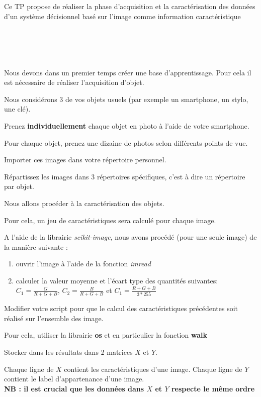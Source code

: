 \documentclass[12pt]{tdtp}
\begin{document}
\titre
Ce TP propose de réaliser la phase d'acquisition et la caractérisation des données d'un système décisionnel basé sur l'image comme information caractéristique\\
\\
\\
\\\

\Exo

Nous devons dans un premier temps créer une base d'apprentissage. Pour cela il est nécessaire de réaliser l'acquisition d'objet.

Nous considérons 3 de vos objets usuels (par exemple un smartphone, un stylo, une clé).

Prenez \textbf{individuellement} chaque objet en photo à l'aide de votre smartphone.

Pour chaque objet, prenez une dizaine de photos selon différents points de vue.

Importer ces images dans votre répertoire personnel.

Répartissez les images dans 3 répertoires spécifiques, c'est à dire un répertoire par objet.


\Exo

Nous allons procéder à la caractérisation des objets.

Pour cela, un jeu de caractéristiques sera calculé pour chaque image.

A l'aide de la librairie \textit{scikit-image}, nous avons procédé (pour une seule image) de la manière suivante :

\begin{enumerate}
	\item ouvrir l'image à l'aide de la fonction \textit{imread}
	\item calculer la valeur moyenne et l'écart type des quantités suivantes: $C_1 = \frac{G}{R+G+B}$, $C_2 = \frac{B}{R+G+B}$  et $C_1 = \frac{R+G+B}{3*255}$ 
\end{enumerate}

\Exo 

Modifier votre script pour que le calcul des caractéristiques précédentes soit réalisé sur l'ensemble des image.

Pour cela, utiliser la librairie \textbf{os} et en particulier la fonction \textbf{walk}

Stocker dans les résultats dans 2 matrices $X$ et $Y$. 

Chaque ligne de $X$ contient les caractéristiques d'une image. Chaque ligne de $Y$ contient le label d'appartenance d'une image.
\\
\textbf{NB : il est crucial que les données dans $X$ et $Y$ respecte le même ordre}
\end{document}
